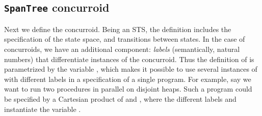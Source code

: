 \subsection{\texttt{SpanTree} concurroid}
\label{sec:graph-conc-coher}


Next we define the  concurroid. Being an STS, the
definition includes the specification of the state space, and
transitions between states. In the case of concurroids, we have an
additional component: \emph{labels} (semantically, natural numbers)
that differentiate instances of the concurroid. Thus the
definition of  is parametrized by the variable
, which makes it possible to use several instances of
 with different labels in a specification of a single
program. For example, say we want to run two  procedures
in parallel on disjoint heaps. Such a program could be specified by a
Cartesian product of  and ,
where the different labels  and  instantiate the
variable .

